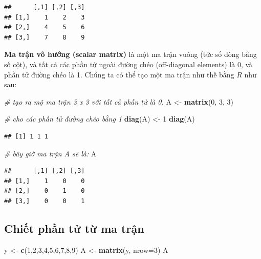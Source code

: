 \documentclass[
]{book}
\newenvironment{Shaded}{\begin{snugshade}}{\end{snugshade}}
\newcommand{\CommentTok}[1]{\textcolor[rgb]{0.56,0.35,0.01}{\textit{#1}}}
\newcommand{\DataTypeTok}[1]{\textcolor[rgb]{0.13,0.29,0.53}{#1}}
\newcommand{\DecValTok}[1]{\textcolor[rgb]{0.00,0.00,0.81}{#1}}
\newcommand{\KeywordTok}[1]{\textcolor[rgb]{0.13,0.29,0.53}{\textbf{#1}}}
\newcommand{\NormalTok}[1]{#1}
\newcommand{\StringTok}[1]{\textcolor[rgb]{0.31,0.60,0.02}{#1}}
\begin{document}
\begin{verbatim}
##      [,1] [,2] [,3]
## [1,]    1    2    3
## [2,]    4    5    6
## [3,]    7    8    9
\end{verbatim}

\textbf{Ma trận vô hướng (scalar matrix)} là một ma trận vuông (tức số dòng bằng số cột), và tất cả các phần tử ngoài đường chéo (off-diagonal elements) là 0, và phần tử đường chéo là 1. Chúng ta có thể tạo một ma trận như thế bằng \(R\) như sau:

\begin{Shaded}
\begin{Highlighting}[]
\CommentTok{\# tạo ra mộ ma trận 3 x 3 với tất cả phần tử là 0.}
\NormalTok{A \textless{}{-}}\StringTok{ }\KeywordTok{matrix}\NormalTok{(}\DecValTok{0}\NormalTok{, }\DecValTok{3}\NormalTok{, }\DecValTok{3}\NormalTok{)}
\end{Highlighting}
\end{Shaded}

\begin{Shaded}
\begin{Highlighting}[]
\CommentTok{\# cho các phần tử đường chéo bằng 1}
\KeywordTok{diag}\NormalTok{(A) \textless{}{-}}\StringTok{ }\DecValTok{1}
\KeywordTok{diag}\NormalTok{(A)}
\end{Highlighting}
\end{Shaded}

\begin{verbatim}
## [1] 1 1 1
\end{verbatim}

\begin{Shaded}
\begin{Highlighting}[]
\CommentTok{\# bây giờ ma trận A sẽ là:}
\NormalTok{A}
\end{Highlighting}
\end{Shaded}

\begin{verbatim}
##      [,1] [,2] [,3]
## [1,]    1    0    0
## [2,]    0    1    0
## [3,]    0    0    1
\end{verbatim}

\hypertarget{chiux1ebft-phux1ea7n-tux1eed-tux1eeb-ma-trux1eadn}{%
\subsection{Chiết phần tử từ ma trận}\label{chiux1ebft-phux1ea7n-tux1eed-tux1eeb-ma-trux1eadn}}

\begin{Shaded}
\begin{Highlighting}[]
\NormalTok{y \textless{}{-}}\StringTok{ }\KeywordTok{c}\NormalTok{(}\DecValTok{1}\NormalTok{,}\DecValTok{2}\NormalTok{,}\DecValTok{3}\NormalTok{,}\DecValTok{4}\NormalTok{,}\DecValTok{5}\NormalTok{,}\DecValTok{6}\NormalTok{,}\DecValTok{7}\NormalTok{,}\DecValTok{8}\NormalTok{,}\DecValTok{9}\NormalTok{)}
\NormalTok{A \textless{}{-}}\StringTok{ }\KeywordTok{matrix}\NormalTok{(y, }\DataTypeTok{nrow=}\DecValTok{3}\NormalTok{)}
\NormalTok{A}
\end{Highlighting}
\end{Shaded}
\end{document}
